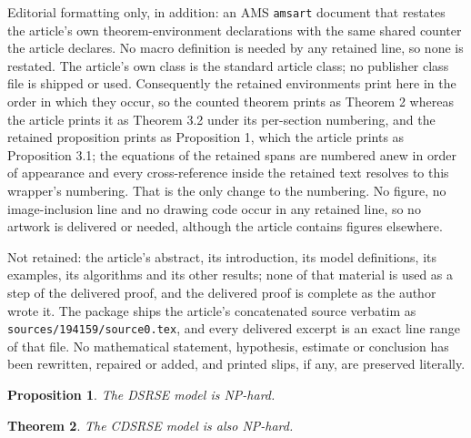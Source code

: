 \documentclass[10pt,a4paper]{amsart}
\theoremstyle{plain}
\newtheorem{theorem}{Theorem}
\newtheorem{proposition}[theorem]{Proposition}
\theoremstyle{definition}
\theoremstyle{remark}
\begin{document}
Editorial formatting only, in addition: an AMS \texttt{amsart} document that restates the article's own theorem-environment declarations with the same shared counter the article declares. No macro definition is needed by any retained line, so none is restated. The article's own class is the standard article class; no publisher class file is shipped or used. Consequently the retained environments print here in the order in which they occur, so the counted theorem prints as Theorem 2 whereas the article prints it as Theorem 3.2 under its per-section numbering, and the retained proposition prints as Proposition 1, which the article prints as Proposition 3.1; the equations of the retained spans are numbered anew in order of appearance and every cross-reference inside the retained text resolves to this wrapper's numbering. That is the only change to the numbering. No figure, no image-inclusion line and no drawing code occur in any retained line, so no artwork is delivered or needed, although the article contains figures elsewhere.

Not retained: the article's abstract, its introduction, its model definitions, its examples, its algorithms and its other results; none of that material is used as a step of the delivered proof, and the delivered proof is complete as the author wrote it. The package ships the article's concatenated source verbatim as \texttt{sources/194159/source0.tex}, and every delivered excerpt is an exact line range of that file. No mathematical statement, hypothesis, estimate or conclusion has been rewritten, repaired or added, and printed slips, if any, are preserved literally.
\begin{proposition}\label{prop:NP-hard}
     The DSRSE model is NP-hard.
\end{proposition}

\begin{theorem}
     The CDSRSE model is also NP-hard.
\end{theorem}
\end{document}
